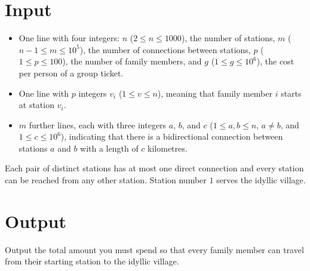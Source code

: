 \vspace{-0.5cm}
\section*{Input}
	\begin{itemize}
		\item One line with four integers: $n$ ($2 \le n \le 1000$), the number of stations, $m$
			($n-1 \le m \le 10^5$), the number of connections between stations, $p$ ($1 \le p \le 100$),
			the number of family members, and $g$ ($1 \le g \le 10^6$), the cost per person of a group ticket.
		\item One line with $p$ integers $v_i$ ($1 \le v \le n$), meaning that family member $i$ starts at station $v_i$.
		\item $m$ further lines, each with three integers $a$, $b$, and $c$ (${1 \le a,b \le n}$, $a\neq b$, and ${1 \le c \le 10^6}$),
			indicating that there is a bidirectional connection between stations $a$ and $b$ with a length of $c$ kilometres.
	\end{itemize}
  Each pair of distinct stations has at most one direct connection and every station can be reached from any other station.
  Station number $1$ serves the idyllic village.

\section*{Output}
	Output the total amount you must spend so that every family member can travel from their starting station to the idyllic village.
